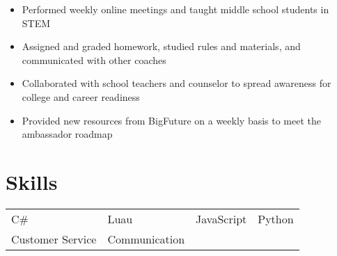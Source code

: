 \documentclass{my_cv} %
\begin{document}
\begin{itemize}
    \item Performed weekly online meetings and taught middle school students in STEM
    \item Assigned and graded homework, studied rules and materials, and communicated with other coaches
\end{itemize}

\begin{itemize}
    \item Collaborated with school teachers and counselor to spread awareness for college and career readiness
    \item Provided new resources from BigFuture on a weekly basis to meet the ambassador roadmap
\end{itemize}

\section{Skills}

\begin{tabular}{l l l l}
C\# & Luau & JavaScript & Python \\
Customer Service & Communication
\end{tabular}
\end{document}
